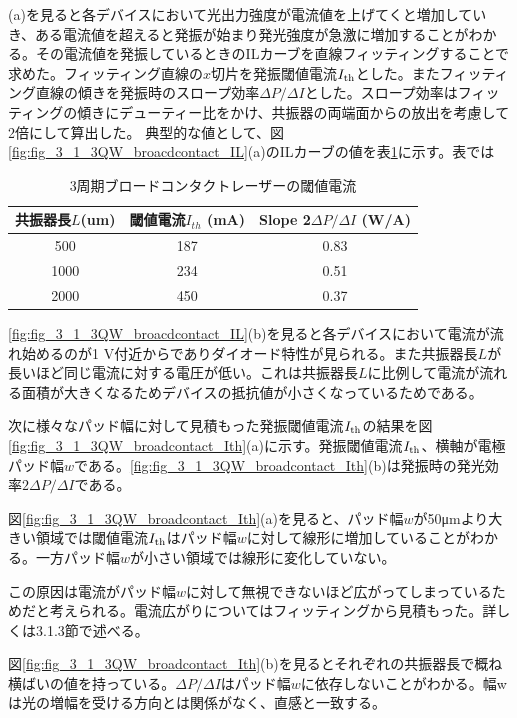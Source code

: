 (a)を見ると各デバイスにおいて光出力強度が電流値を上げてくと増加していき、ある電流値を超えると発振が始まり発光強度が急激に増加することがわかる。その電流値を発振しているときのILカーブを直線フィッティングすることで求めた。フィッティング直線の$x$切片を発振閾値電流$I_{\rm{th}}$とした。またフィッティング直線の傾きを発振時のスロープ効率$\Delta P/\Delta I$とした。スロープ効率はフィッティングの傾きにデューティー比をかけ、共振器の両端面からの放出を考慮して2倍にして算出した。
典型的な値として、図\ref{fig:fig_3_1_3QW_broacdcontact_IL}(a)のILカーブの値を表\ref{table:table_3_1_3QW_broadcontact}に示す。表では
\begin{table}[h]
  \caption{3周期ブロードコンタクトレーザーの閾値電流}
  \label{table:table_3_1_3QW_broadcontact}
  \centering
  \begin{tabular}{ccc}
    \hline
    共振器長$L$(um)  & 閾値電流$I_{th}$ (mA)  & Slope 2$\Delta P/\Delta I$ (W/A) \\
    \hline \hline
     500& 187&  0.83  \\
    1000& 234& 0.51\\
    2000& 450&0.37\\
       \hline
  \end{tabular}
\end{table}



\ref{fig:fig_3_1_3QW_broacdcontact_IL}(b)を見ると各デバイスにおいて電流が流れ始めるのが1 V付近からでありダイオード特性が見られる。また共振器長$L$が長いほど同じ電流に対する電圧が低い。これは共振器長$L$に比例して電流が流れる面積が大きくなるためデバイスの抵抗値が小さくなっているためである。


次に様々なパッド幅に対して見積もった発振閾値電流$I_{\rm{th}}$の結果を図\ref{fig:fig_3_1_3QW_broadcontact_Ith}(a)に示す。発振閾値電流$I_{\rm{th}}$、横軸が電極パッド幅$w$である。\ref{fig:fig_3_1_3QW_broadcontact_Ith}(b)は発振時の発光効率$2 \Delta P/\Delta I$である。

図\ref{fig:fig_3_1_3QW_broadcontact_Ith}(a)を見ると、パッド幅$w$が50\si{ \micro\metre}より大きい領域では閾値電流$I_{\rm{th}}$はパッド幅$w$に対して線形に増加していることがわかる。一方パッド幅$w$が小さい領域では線形に変化していない。

この原因は電流がパッド幅$w$に対して無視できないほど広がってしまっているためだと考えられる。電流広がりについてはフィッティングから見積もった。詳しくは3.1.3節で述べる。

図\ref{fig:fig_3_1_3QW_broadcontact_Ith}(b)を見るとそれぞれの共振器長で概ね横ばいの値を持っている。$\Delta P/\Delta I$はパッド幅$w$に依存しないことがわかる。幅wは光の増幅を受ける方向とは関係がなく、直感と一致する。

